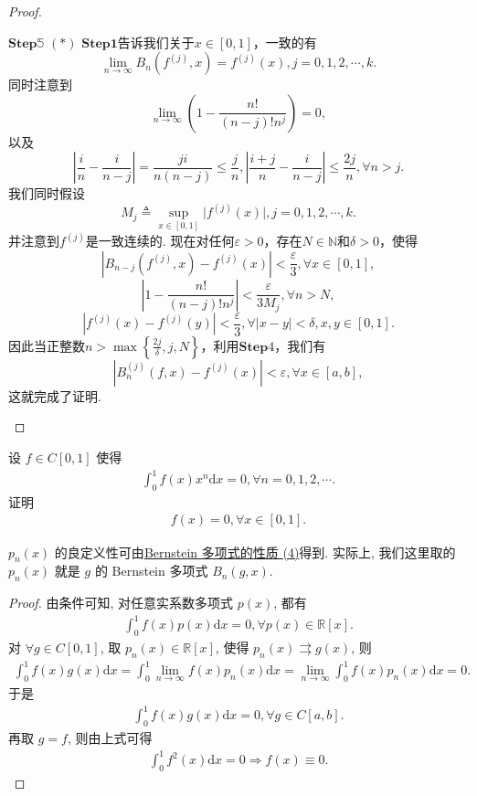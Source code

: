 \documentclass[../../main.tex]{subfiles}%
\begin{document}
\begin{proof}
\begin{enumerate}[(1)]
$\mathbf{Step}\mathbb{5}$ \((*)\) $\mathbf{Step}\mathbf{1}$告诉我们关于\(x\in[0,1]\)，一致的有
\[
\lim_{n\rightarrow\infty}B_n\left(f^{(j)},x\right)=f^{(j)}(x),j = 0,1,2,\cdots,k.
\]
同时注意到
\[
\lim_{n\rightarrow\infty}\left(1-\frac{n!}{(n - j)!n^j}\right)=0,
\]
以及
\[
\left|\frac{i}{n}-\frac{i}{n - j}\right|=\frac{ji}{n(n - j)}\leqslant\frac{j}{n},\left|\frac{i + j}{n}-\frac{i}{n - j}\right|\leqslant\frac{2j}{n},\forall n>j.
\]
我们同时假设
\[
M_j\triangleq\sup_{x\in[0,1]}\vert f^{(j)}(x)\vert,j = 0,1,2,\cdots,k.
\]
并注意到\(f^{(j)}\)是一致连续的.
现在对任何\(\varepsilon>0\)，存在\(N\in\mathbb{N}\)和\(\delta>0\)，使得
\[
\left|B_{n - j}\left(f^{(j)},x\right)-f^{(j)}(x)\right|<\frac{\varepsilon}{3},\forall x\in[0,1],
\]
\[
\left|1-\frac{n!}{(n - j)!n^j}\right|<\frac{\varepsilon}{3M_j},\forall n>N,
\]
\[
\left|f^{(j)}(x)-f^{(j)}(y)\right|<\frac{\varepsilon}{3},\forall\vert x - y\vert<\delta,x,y\in[0,1].
\]
因此当正整数\(n>\max\left\{\frac{2j}{\delta},j,N\right\}\)，利用$\mathbf{Step}4$，我们有
\[
\left|B_n^{(j)}(f,x)-f^{(j)}(x)\right|<\varepsilon,\forall x\in[a,b],
\]
这就完成了证明. 
\end{enumerate}
\end{proof}

\begin{proposition}\label{proposition:x^n与任意连续函数f的积分都为0则f=0}
设 $f \in C[0,1]$ 使得 
\begin{align*}
\int_{0}^{1} f(x)x^{n}\mathrm{d}x = 0, \forall n = 0,1,2,\cdots.
\end{align*}
证明
\begin{align*}
f(x) = 0, \forall x \in [0,1].
\end{align*} 
\end{proposition}
\begin{remark}
$p_n(x)$ 的良定义性可由\hyperref[theorem:Bernstein多项式的性质]{Bernstein 多项式的性质 (4)}得到. 实际上, 我们这里取的 $p_n(x)$ 就是 $g$ 的 Bernstein 多项式 $B_n(g,x)$.
\end{remark}
\begin{proof}
由条件可知, 对任意实系数多项式 $p(x)$, 都有
\begin{align*}
\int_0^1 f(x) p(x) \mathrm{d}x = 0, \forall p(x) \in \mathbb{R}[x].
\end{align*}
对 $\forall g \in C[0,1]$, 取 $p_n(x) \in \mathbb{R}[x]$, 使得 $p_n(x) \rightrightarrows g(x)$, 则
\begin{align*}
\int_0^1 f(x) g(x) \mathrm{d}x = \int_0^1 \lim_{n\rightarrow \infty} f(x) p_n(x) \mathrm{d}x = \lim_{n\rightarrow \infty} \int_0^1 f(x) p_n(x) \mathrm{d}x = 0.
\end{align*}
于是
\begin{align*}
\int_0^1 f(x) g(x) \mathrm{d}x = 0, \forall g \in C[a,b].
\end{align*}
再取 $g = f$, 则由上式可得
\begin{align*}
\int_0^1 f^2(x) \mathrm{d}x = 0 \Rightarrow f(x) \equiv 0.
\end{align*}
\end{proof}
\end{document}
